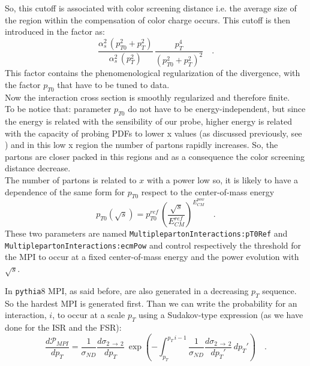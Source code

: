 \noindent So, this cutoff is associated with color screening distance i.e. the average size of the region within the  compensation of color charge occurs.
This cutoff is then introduced in the factor as:
\begin{equation}
	\frac{\alpha_s^2\,(p_{T0}^2+p_{T}^2)}{\alpha_s^2\,(p_T^2)}\,\frac{p_T^4}{(p_{T0}^2+p_T^2)^2}\quad .
\end{equation}
This factor contains the phenomenological regularization of the divergence, with the factor $p_{T0}$ that have to be tuned to data. 
\\
Now the interaction cross section is smoothly regularized and therefore finite.
\\
To be notice that: parameter $p_{T0}$ do not have to be energy-independent, but since the energy is related with the sensibility of our probe, higher energy is related with the capacity of probing PDFs to lower x values (as discussed previously, see ) and in this low x region the number of partons rapidly increases. So, the partons are closer packed in this regions and as a consequence the color screening distance decrease.
\\
The number of partons is related to $x$ with a power low so, it is likely to have a dependence of the same form for $p_{T0}$ respect to the center-of-mass energy
\begin{equation}
	p_{T0}(\sqrt{s})=p_{T0}^{ref} \,\left( \frac{\sqrt{s}}{E_{CM}^{ref}} \right)^{E_{CM}^{pow}}\quad .
\end{equation}
These two parameters are named \texttt{MultiplepartonInteractions:pT0Ref} and \texttt{MultiplepartonInteractions:ecmPow} and control respectively the threshold for the MPI to occur at a fixed center-of-mass energy and the power evolution with $\sqrt{s}$. 


In \texttt{pythia}8 MPI, as said before, are also generated in a decreasing $p_T$ sequence. So the hardest MPI is generated first. Than we can write the probability for an interaction, $i$, to occur at a scale $p_T$ using a Sudakov-type expression (as we have done for the ISR and the FSR):
\begin{equation}
	\frac{d\mathcal{P}_{MPI}}{dp_T}=\frac{1}{\sigma_{ND}}\frac{d\sigma_{2\,\rightarrow\,2}}{dp_T}\ \exp\left( -\displaystyle\int_{p_T}^{p_T\,i-1} \frac{1}{\sigma_{ND}}\frac{d\sigma_{2\,\rightarrow\,2}}{dp_T'}\,dp_T' \right)\quad .
\end{equation}


